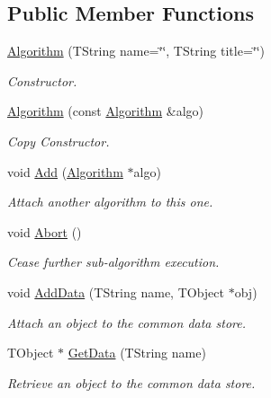 \subsection*{Public Member Functions}
\begin{DoxyCompactItemize}
\item 
\hyperlink{class_h_a_l_1_1_algorithm_a50506c07b5959ecd740f5683bf50ea93}{Algorithm} (T\+String name=\char`\"{}\char`\"{}, T\+String title=\char`\"{}\char`\"{})
\begin{DoxyCompactList}\small\item\em Constructor. \end{DoxyCompactList}\item 
\hyperlink{class_h_a_l_1_1_algorithm_a77b66292cc2f8e021ed819daebbd7c51}{Algorithm} (const \hyperlink{class_h_a_l_1_1_algorithm}{Algorithm} \&algo)
\begin{DoxyCompactList}\small\item\em Copy Constructor. \end{DoxyCompactList}\item 
void \hyperlink{class_h_a_l_1_1_algorithm_a6e6834d936897cd573ce858d9b26150e}{Add} (\hyperlink{class_h_a_l_1_1_algorithm}{Algorithm} $\ast$algo)
\begin{DoxyCompactList}\small\item\em Attach another algorithm to this one. \end{DoxyCompactList}\item 
void \hyperlink{class_h_a_l_1_1_algorithm_a0b2b7e0a90824e7c2ed31fd8fc299d61}{Abort} ()
\begin{DoxyCompactList}\small\item\em Cease further sub-\/algorithm execution. \end{DoxyCompactList}\item 
void \hyperlink{class_h_a_l_1_1_algorithm_a7fd35cf6dc1962b58e48905b178c1747}{Add\+Data} (T\+String name, T\+Object $\ast$obj)
\begin{DoxyCompactList}\small\item\em Attach an object to the common data store. \end{DoxyCompactList}\item 
T\+Object $\ast$ \hyperlink{class_h_a_l_1_1_algorithm_ae9b228550b42524824f7119604df1add}{Get\+Data} (T\+String name)
\begin{DoxyCompactList}\small\item\em Retrieve an object to the common data store. \end{DoxyCompactList}\item 

\end{DoxyCompactItemize}
